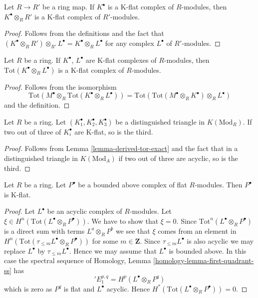 \begin{lemma}
\label{lemma-base-change-K-flat}
Let $R \to R'$ be a ring map. If $K^\bullet$ is a K-flat complex
of $R$-modules, then $K^\bullet \otimes_R R'$ is a K-flat complex
of $R'$-modules.
\end{lemma}

\begin{proof}
Follows from the definitions and the fact that
$(K^\bullet \otimes_R R') \otimes_{R'} L^\bullet =
K^\bullet \otimes_R L^\bullet$ for any complex
$L^\bullet$ of $R'$-modules.
\end{proof}

\begin{lemma}
\label{lemma-tensor-product-K-flat}
Let $R$ be a ring. If $K^\bullet$, $L^\bullet$ are K-flat complexes
of $R$-modules, then $\text{Tot}(K^\bullet \otimes_R L^\bullet)$ is a
K-flat complex of $R$-modules.
\end{lemma}

\begin{proof}
Follows from the isomorphism
$$
\text{Tot}(M^\bullet \otimes_R \text{Tot}(K^\bullet \otimes_R L^\bullet))
=
\text{Tot}(\text{Tot}(M^\bullet \otimes_R K^\bullet) \otimes_R L^\bullet)
$$
and the definition.
\end{proof}

\begin{lemma}
\label{lemma-K-flat-two-out-of-three}
Let $R$ be a ring. Let $(K_1^\bullet, K_2^\bullet, K_3^\bullet)$ be
a distinguished triangle in $K(\text{Mod}_R)$. If two out of three
of $K_i^\bullet$ are K-flat, so is the third.
\end{lemma}

\begin{proof}
Follows from
Lemma \ref{lemma-derived-tor-exact}
and the fact that in a distinguished triangle in
$K(\text{Mod}_A)$ if two out of three are acyclic, so is the third.
\end{proof}

\begin{lemma}
\label{lemma-derived-tor-quasi-isomorphism}
Let $R$ be a ring. Let $P^\bullet$ be a bounded above complex of
flat $R$-modules. Then $P^\bullet$ is K-flat.
\end{lemma}

\begin{proof}
Let $L^\bullet$ be an acyclic complex of $R$-modules.
Let $\xi \in H^n(\text{Tot}(L^\bullet \otimes_R P^\bullet))$.
We have to show that $\xi = 0$.
Since $\text{Tot}^n(L^\bullet \otimes_R P^\bullet)$ is a direct
sum with terms $L^a \otimes_R P^b$ we see that $\xi$ comes from
an element in $H^n(\text{Tot}(\tau_{\leq m}L^\bullet \otimes_R P^\bullet))$
for some $m \in \mathbf{Z}$. Since $\tau_{\leq m}L^\bullet$ is also
acyclic we may replace $L^\bullet$ by $\tau_{\leq m}L^\bullet$.
Hence we may assume that $L^\bullet$ is bounded above.
In this case the spectral sequence of
Homology, Lemma \ref{homology-lemma-first-quadrant-ss}
has
$$
{}'E_1^{p, q} = H^p(L^\bullet \otimes_R P^q)
$$
which is zero as $P^q$ is flat and $L^\bullet$ acyclic. Hence
$H^*(\text{Tot}(L^\bullet \otimes_R P^\bullet)) = 0$.
\end{proof}

